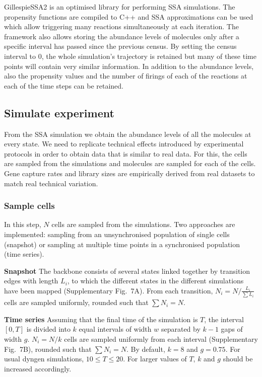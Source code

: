 \documentclass[10pt, a4paper]{article}
\begin{document}
GillespieSSA2 is an optimised library for performing SSA simulations.
The propensity functions are compiled to C++ and SSA approximations can
be used which allow triggering many reactions simultaneously at each
iteration. The framework also allows storing the abundance levels of
molecules only after a specific interval has passed since the previous
census. By setting the census interval to 0, the whole simulation's
trajectory is retained but many of these time points will contain very
similar information. In addition to the abundance levels, also the
propensity values and the number of firings of each of the reactions at
each of the time steps can be retained.

\hypertarget{sec:dyngen-experiment}{%
	\subsection*{Simulate experiment}\label{sec:dyngen-experiment}}

From the SSA simulation we obtain the abundance levels of all the
molecules at every state. We need to replicate technical effects
introduced by experimental protocols in order to obtain data that is
similar to real data. For this, the cells are sampled from the
simulations and molecules are sampled for each of the cells. Gene
capture rates and library sizes are empirically derived from real
datasets to match real technical variation.

\hypertarget{sample-cells}{%
	\subsubsection*{Sample cells}\label{sample-cells}}

In this step, \(N\) cells are sampled from the simulations. Two
approaches are implemented: sampling from an unsynchronised population
of single cells (snapshot) or sampling at multiple time points in a
synchronised population (time series).

\textbf{Snapshot} The backbone consists of several states linked
together by transition edges with length \(L_i\), to which the different
states in the different simulations have been mapped (Supplementary
Fig.~7A). From each transition, \(N_i = N / \frac{L_i}{\sum L_i}\) cells
are sampled uniformly, rounded such that \(\sum N_i = N\).

\textbf{Time series} Assuming that the final time of the simulation is
\(T\), the interval \([0, T]\) is divided into \(k\) equal intervals of
width \(w\) separated by \(k-1\) gaps of width \(g\). \(N_i = N / k\)
cells are sampled uniformly from each interval (Supplementary Fig.~7B),
rounded such that \(\sum N_i = N\). By default, \(k = 8\) and
\(g = 0.75\). For usual dyngen simulations, \(10 \leq T \leq 20\). For
larger values of \(T\), \(k\) and \(g\) should be increased accordingly.
\end{document}
